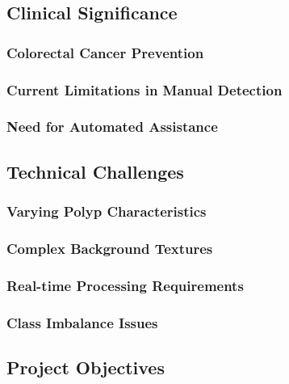 \documentclass[12pt,a4paper]{report}
\begin{document}
\subsection{Clinical Significance}

\subsubsection{Colorectal Cancer Prevention}

\subsubsection{Current Limitations in Manual Detection}

\subsubsection{Need for Automated Assistance}

\subsection{Technical Challenges}

\subsubsection{Varying Polyp Characteristics}

\subsubsection{Complex Background Textures}

\subsubsection{Real-time Processing Requirements}

\subsubsection{Class Imbalance Issues}

\subsection{Project Objectives}
\end{document}
